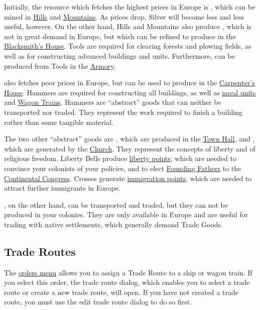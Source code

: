 \documentclass[12pt]{book}
\begin{document}
Initially, the resource which fetches the highest prices in Europe is
, which can be mined in \hyperlink{Hills}{Hills} and
\hyperlink{Mountains}{Mountains}. As prices drop, Silver will become
less and less useful, however. On the other hand, Hills and Mountains
also produce , which is not in great demand in Europe, but
which can be refined to produce  in the
\hyperlink{Blacksmith's House}{Blacksmith's House}. Tools are required
for clearing forests and plowing fields, as well as for constructing
advanced buildings and units. Furthermore,  can be
produced from Tools in the \hyperlink{Armory}{Armory}.

 also fetches poor prices in Europe, but can be used to
produce  in the \hyperlink{Carpenter's
House}{Carpenter's House}. Hammers are required for constructing all
buildings, as well as \hyperlink{Naval Units}{naval units} and
\hyperlink{Wagon Train}{Wagon Trains}. Hammers are ``abstract'' goods
that can neither be transported nor traded. They represent the work
required to finish a building rather than some tangible material.

The two other ``abstract'' goods are , which are
produced in the \hyperlink{Town Hall}{Town Hall}, and ,
which are generated by the \hyperlink{Church}{Church}. They represent
the concepts of liberty and of religious freedom. Liberty Bells
produce \hyperlink{Liberty}{liberty points}, which are needed to
convince your colonists of your policies, and to elect
\hyperlink{Founding Fathers}{Founding Fathers} to the
\hyperlink{Continental Congress}{Continental Congress}. Crosses
generate \hyperlink{Immigration}{immigration points}, which are needed
to attract further immigrants in Europe.

, on the other hand, can be transported and traded,
but they can not be produced in your colonies. They are only available
in Europe and are useful for trading with native settlements, which
generally demand Trade Goods.


\hypertarget{Trade Routes}{\subsection{Trade Routes}}

The \hyperlink{orders menu}{orders menu} allows you to assign a Trade
Route to a ship or wagon train. If you select this order, the trade
route dialog, which enables you to select a trade route or create a
new trade route, will open. If you have not created a trade route, you
must use the edit trade route dialog to do so first.
\end{document}
